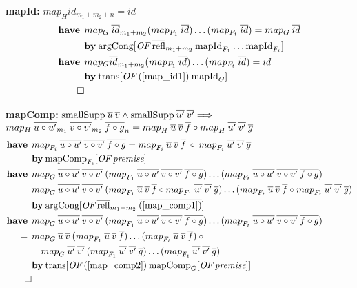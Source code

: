 \newcommand{\have}{\textbf{have}\:\:}
\newcommand{\by}{\textbf{by}\:}

\textbf{mapId:} $map_H \overline{id}_{m_1+m_2+n} = id$
\begin{align}
\have & map_G \: \overline{id}_{m_1+m_2} (map_{F_1} \: \overline{id}) \dots (map_{F_t} \: \overline{id}) = map_G \: \overline{id} \label{map_id1} \\*
 & \by \OF{\text{argCong}}{\overline{\text{refl}}_{m_1+m_2} \: \text{mapId}_{F_1} \dots \text{mapId}_{F_t}} \nonumber \\
\have & map_G \overline{id}_{m_1+m_2} (map_{F_1} \: \overline{id}) \dots (map_{F_t} \: \overline{id}) = id \\*
& \by \OF{\text{trans}}{(\ref{map_id1}) \: \text{mapId}_G} \nonumber \\*
\qed \nonumber
\end{align}

\textbf{mapComp:} $\text{smallSupp} \: \overline{u} \: \overline{v} \wedge \text{smallSupp} \: \overline{u'} \: \overline{v'} \Longrightarrow$ \\
\hspace*{1.7em} $map_H \: \overline{u \circ u'}_{m_1} \: \overline{v \circ v'}_{m_2} \: \overline{f \circ g}_n = {map}_{H} \: \overline{u} \: \overline{v} \: \overline{f} \circ {map}_{H} \: \overline{u'} \: \overline{v'} \: \overline{g}$
\begin{align}
\have & \map{F_i}{u \circ u'}{v \circ v'}{f \circ g} = \map{F_i}{u}{v}{f} \: \circ \: \map{F_i}{u'}{v'}{g} \label{map_comp1} \\*
 & \by \OF{\text{mapComp}_{F_i}}{\textit{premise}} \nonumber \\
%
\have & \map{G}{u \circ u'}{v \circ v'}{}(\map{F_1}{u \circ u'}{v \circ v'}{f \circ g})\dots(\map{F_t}{u \circ u'}{v \circ v'}{f \circ g}) \nonumber \\*
= \:\: & \map{G}{u \circ u'}{v \circ v'}{}(\map{F_1}{u}{v}{f} \circ \map{F_1}{u'}{v'}{g})\dots(\map{F_t}{u}{v}{f} \circ \map{F_t}{u'}{v'}{g}) \label{map_comp2} \\*
& \by \OF{\text{argCong}}{\overline{\text{refl}}_{m_1+m_2} \: \overline{(\ref{map_comp1})}} \nonumber \\
%
\have & \map{G}{u \circ u'}{v \circ v'}{}(\map{F_1}{u \circ u'}{v \circ v'}{f \circ g})\dots(\map{F_t}{u \circ u'}{v \circ v'}{f \circ g}) \nonumber \\*
= \:\: & \map{G}{u}{v}{}(\map{F_1}{u}{v}{f})\dots(\map{F_t}{u}{v}{f}) \: \circ \nonumber \\*
& \quad \map{G}{u'}{v'}{}(\map{F_1}{u'}{v'}{g})\dots(\map{F_t}{u'}{v'}{g}) \label{map_comp3} \\*
& \by \OF{\text{trans}}{(\ref{map_comp2}) \: \OF{\text{mapComp}_G}{\textit{premise}}} \nonumber \\*
\qed \nonumber
\end{align}

